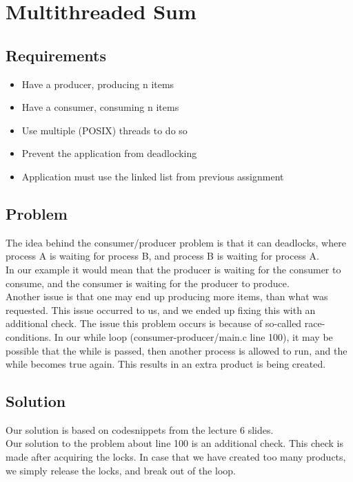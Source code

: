 \chapter{Multithreaded Sum}

\section{Requirements}

\begin{itemize}
\item Have a producer, producing n items
\item Have a consumer, consuming n items
\item Use multiple (POSIX) threads to do so
\item Prevent the application from deadlocking
\item Application must use the linked list from previous assignment
\end{itemize}

\section{Problem}

The idea behind the consumer/producer problem is that it can deadlocks, where process A is waiting for process B, and process B is waiting for process A.\\

In our example it would mean that the producer is waiting for the consumer to consume, and the consumer is waiting for the producer to produce.\\

Another issue is that one may end up producing more items, than what was requested. This issue occurred to us, and we ended up fixing this with an additional check.
The issue this problem occurs is because of so-called race-conditions.
In our while loop (consumer-producer/main.c line 100), it may be possible that the while is passed, then another process is allowed to run, and the while becomes true again. This results in an extra product is being created.

\section{Solution}
Our solution is based on codesnippets from the lecture 6 slides.\\

Our solution to the problem about line 100 is an additional check. This check is made after acquiring the locks.
In case that we have created too many products, we simply release the locks, and break out of the loop. \\

